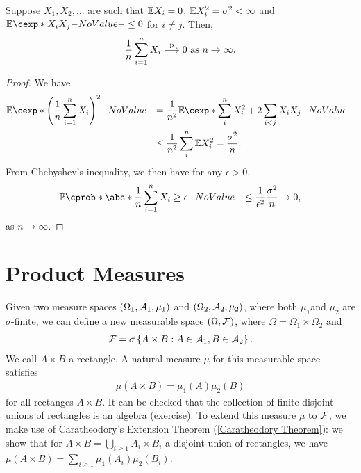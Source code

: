 \documentclass[12pt]{article}
\begin{document}
\begin{Theorem}\label{wk5:Thm:WLLN}
Suppose $X_1,X_2, \ldots$ are such that $\E X_i=0$, $\E X_i^2=\sigma^2<\infty$ and $\E[X_i X_j] \leq 0$ for  $i\neq j$. Then,
\begin{align*}
{\frac{1}{n}} \sum_{i=1}^n {X_i} \stackrel{\mathrm{p}}{\longrightarrow} 0 \text{ as } n \to \infty.
\end{align*}
\end{Theorem}
\begin{proof}
We have
\begin{align*}
\E[\left(\frac{1}{n} \sum_{i=1}^n{X_i}\right)^2] 
&= \frac{1}{n^2} \E [\sum_{i}^n{X_i^2}+2\sum_{i<j}{X_i X_j}]\\
& \leq \frac{1}{n^2}  \sum_{i}^n{\E X_i^2}= \frac{\sigma^2}{n}.
\end{align*}
From Chebyshev's inequality, we then have for any $\epsilon>0$, 
\begin{align*}
\P(\abs*{\frac{1}{n} \sum_{i=1}^n{X_i}} \geq \epsilon)\leq \frac{1}{\epsilon^2}\frac{\sigma^2}{n}\to 0,
\end{align*}
as $n\to\infty$.
\end{proof}


\section{Product Measures}

Given two measure spaces $(\Omega_1, \mathcal{A}_1, \mu_1)$ and $(\Omega_2, \mathcal{A}_2, \mu_2)$, where both $\mu_1$and $\mu_2$ are $\sigma$-finite, we can define a new measurable space $(\Omega, \mathcal{F})$, where $\Omega=\Omega_1\times\Omega_2$ and 
\begin{align*}
\mathcal{F}= \sigma\left\{A \times B: A\in \mathcal{A}_1, B\in \mathcal{A}_2 \right\}.
\end{align*}
We call $A\times B$ a rectangle. A natural measure $\mu$ for this measurable space satisfies 
\begin{align}\label{prod_mu}
\mu (A \times B )=\mu_1 (A) \mu_2(B)
\end{align}
for all rectanges $A\times B$. It can be checked that the collection of finite disjoint unions of rectangles is an algebra (exercise). To extend this measure $\mu$ to $\mathcal{F}$, we make use of Caratheodory's Extension Theorem (\cref{Caratheodory Theorem}): we show that for $A\times B = \bigcup_{i \geq 1} {A_i \times B_i}$ a disjoint union of rectangles, we have $\mu (A \times B)= \sum_{i \geq 1} {\mu_1 (A_i) \mu_2(B_i)}$. 
\end{document}

